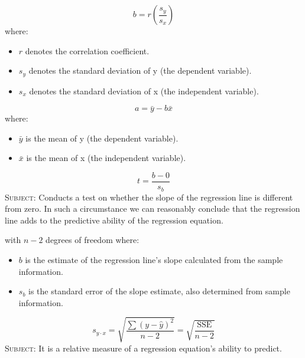 \begin{equation}
\label{linear regression slope regression line}
b = r(\frac{s_{y}}{s_{x}})
\end{equation}
where:
\begin{itemize}
 \item $r$ denotes the correlation coefficient.
 \item $s_{y}$ denotes the standard deviation of y (the dependent variable).
 \item $s_{x}$ denotes the standard deviation of x (the independent variable).
\end{itemize}
\hformbar


\begin{equation}
\label{linear regression y intercept}
a = \bar{y} - b\bar{x}
\end{equation}
where:
\begin{itemize}
 \item $\bar{y}$ is the mean of y (the dependent variable).
 \item $\bar{x}$ is the mean of x (the independent variable).
\end{itemize}
\hformbar


\begin{equation}
\label{linear regression test slope}
t = \frac{b - 0}{s_{b}}
\end{equation}
\textsc{Subject:} Conducts a test on whether the slope of the regression line is different from zero. In such a circumstance we can reasonably conclude that the regression line adds to the predictive ability of the regression equation.

with $n-2$ degrees of freedom where:
\begin{itemize}
 \item $b$ is the estimate of the regression line's slope calculated from the sample information.
 \item $s_{b}$ is the standard error of the slope estimate, also determined from sample information.
\end{itemize}
\hformbar


\begin{equation}
\label{linear regression standard error of estimate}
s_{y \cdotp x} = \sqrt{\frac{\sum(y-\hat{y})^2}{n-2}} = \sqrt{\frac{\text{SSE}}{n-2}}
\end{equation}
\textsc{Subject:} It is a relative measure of a regression equation's ability to predict.

